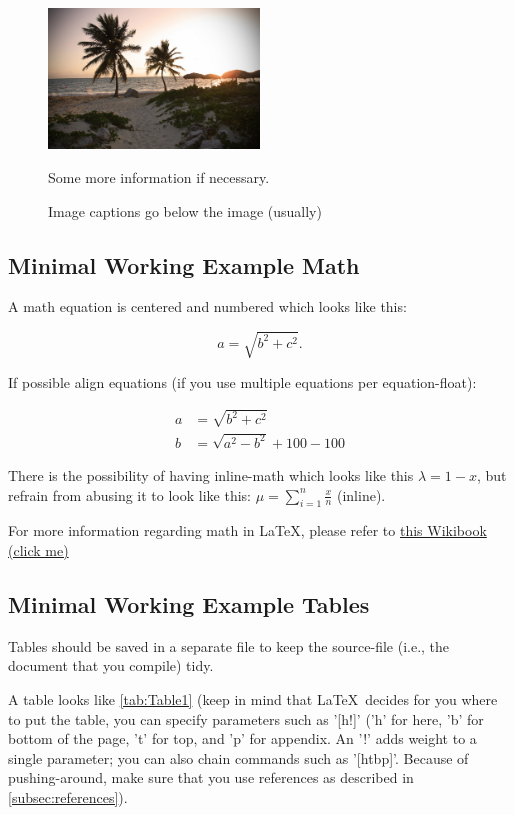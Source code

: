 \documentclass[12pt,a4paper]{article}
\begin{document}
\begin{figure}[h]
\centering
\includegraphics[width=0.5\textwidth]{pictures/beach.jpg}
\caption{Image captions go below the image (usually)}
\small Some more information if necessary.
\end{figure}

\subsection{Minimal Working Example Math}
\label{subsec:math}
A math equation is centered and numbered which looks like this:

\begin{equation}
a = \sqrt{b^2 + c^2}.
\end{equation}

If possible align equations (if you use multiple equations per equation-float):

\begin{equation}
\begin{split}
a &= \sqrt{b^2 + c^2}\\
b &= \sqrt{a^2 - b^2} + 100 - 100 
\end{split}
\end{equation}

There is the possibility of having inline-math which looks like this $\lambda = 1 - x$, but refrain from abusing it to look like this: $\mu = \displaystyle \sum_{i = 1}^{n} \frac{x}{n}$ (inline).

For more information regarding math in \LaTeX, please refer to \href{https://en.wikibooks.org/wiki/LaTeX/Mathematics}{this Wikibook (click me)}

\subsection{Minimal Working Example Tables}
Tables should be saved in a separate file to keep the source-file (i.e., the document that you compile) tidy.

A table looks like \autoref{tab:Table1} (keep in mind that \LaTeX \ decides for you where to put the table, you can specify parameters such as '[h!]' ('h' for here, 'b' for bottom of the page, 't' for top, and 'p' for appendix. An '!' adds weight to a single parameter; you can also chain commands such as '[htbp]'. Because of pushing-around, make sure that you use references as described in \autoref{subsec:references}). 
\end{document}
